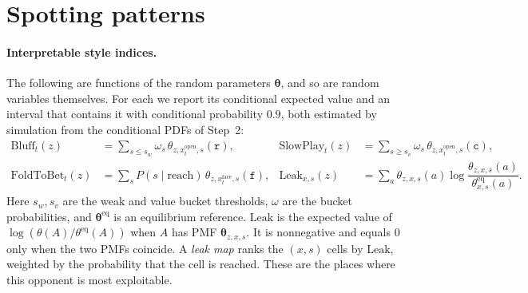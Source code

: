 \documentclass[11pt,a4paper]{article}
\newcommand{\1}{\mathbf{1}}
\begin{document}
\section{Spotting patterns}\label{sec:patterns}

\paragraph{Interpretable style indices.} The following are functions of the
random parameters $\bm\theta$, and so are random variables themselves. For
each we report its conditional expected value and an interval that contains it
with conditional probability $0.9$, both estimated by simulation from the
conditional PDFs of Step~2:
\begin{align}
  \text{Bluff}_t(z)&=\textstyle\sum_{s\le s_w}\omega_s\,\theta_{z,x^{\text{open}}_t,s}(\mathtt{r}),
  &\text{SlowPlay}_t(z)&=\textstyle\sum_{s\ge s_v}\omega_s\,\theta_{z,x^{\text{open}}_t,s}(\mathtt{c}),\\
  \text{FoldToBet}_t(z)&=\textstyle\sum_s P(s\mid\text{reach})\,\theta_{z,x^{\text{face}}_t,s}(\mathtt{f}),
  &\text{Leak}_{x,s}(z)&=\textstyle\sum_a\theta_{z,x,s}(a)\log\dfrac{\theta_{z,x,s}(a)}{\theta^{\text{eq}}_{x,s}(a)}.
\end{align}
Here $s_w,s_v$ are the weak and value bucket thresholds, $\omega$ are the bucket
probabilities, and $\bm\theta^{\text{eq}}$ is an equilibrium reference.
$\text{Leak}$ is the expected value of $\log(\theta(A)/\theta^{\text{eq}}(A))$
when $A$ has PMF $\bm\theta_{z,x,s}$. It is nonnegative and equals $0$ only when
the two PMFs coincide. A \emph{leak map} ranks the $(x,s)$ cells by
$\text{Leak}$, weighted by the probability that the cell is reached. These are
the places where this opponent is most exploitable.
\end{document}
